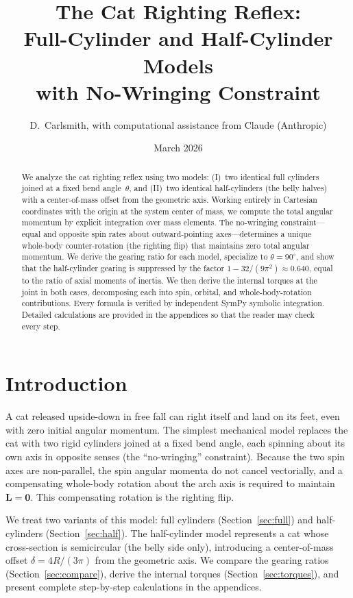 \documentclass[11pt]{article}
\title{The Cat Righting Reflex:\\
Full-Cylinder and Half-Cylinder Models\\with No-Wringing Constraint}
\author{D.\ Carlsmith, with computational assistance from Claude (Anthropic)}
\date{March 2026}
\newcommand{\vect}[1]{\bm{#1}}
\begin{document}
\maketitle

\begin{abstract}
We analyze the cat righting reflex using two models: (I)~two identical
full cylinders joined at a fixed bend angle~$\theta$, and (II)~two
identical half-cylinders (the belly halves) with a center-of-mass offset
from the geometric axis.  Working entirely in Cartesian coordinates with
the origin at the system center of mass, we compute the total angular
momentum by explicit integration over mass elements.  The no-wringing
constraint---equal and opposite spin rates about outward-pointing
axes---determines a unique whole-body counter-rotation (the righting
flip) that maintains zero total angular momentum.  We derive the gearing
ratio for each model, specialize to $\theta=90^\circ$, and show that the
half-cylinder gearing is suppressed by the factor
$1-32/(9\pi^2)\approx0.640$, equal to the ratio of axial moments of
inertia.  We then derive the internal torques at the joint in both
cases, decomposing each into spin, orbital, and whole-body-rotation
contributions. Every formula is verified by independent SymPy symbolic
integration.  Detailed calculations are provided in the appendices so
that the reader may check every step.
\end{abstract}

\tableofcontents

\section{Introduction}

A cat released upside-down in free fall can right itself and land on its
feet, even with zero initial angular momentum.  The simplest mechanical
model replaces the cat with two rigid cylinders joined at a fixed bend
angle, each spinning about its own axis in opposite senses (the
``no-wringing'' constraint).  Because the two spin axes are non-parallel,
the spin angular momenta do not cancel vectorially, and a compensating
whole-body rotation about the arch axis is required to maintain
$\vect{L}=\vect{0}$.  This compensating rotation is the righting flip.

We treat two variants of this model: full cylinders
(Section~\ref{sec:full}) and half-cylinders (Section~\ref{sec:half}).
The half-cylinder model represents a cat whose cross-section is
semicircular (the belly side only), introducing a center-of-mass offset
$\delta=4R/(3\pi)$ from the geometric axis.  We compare the gearing
ratios (Section~\ref{sec:compare}), derive the internal torques
(Section~\ref{sec:torques}), and present complete step-by-step
calculations in the appendices.
\end{document}
